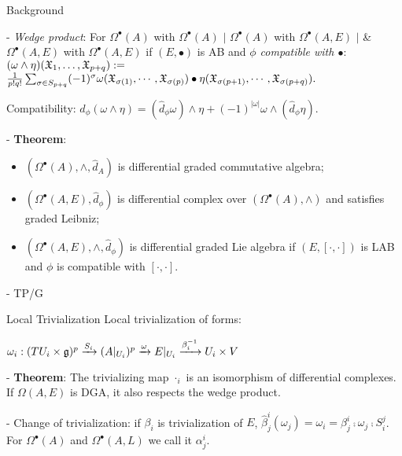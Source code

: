 \begin{frame}{Background}
    
    - \emph{Wedge product}: For $\Omega^\bullet(A)$ with $\Omega^\bullet(A)$ $|$ $\Omega^\bullet(A)$ with $\Omega^\bullet(A,E)$ $|$ \& $\Omega^\bullet(A,E)$ with $\Omega^\bullet(A,E)$ if $(E, \bullet)$ is AB and \emph{$\phi$ compatible with $\bullet$}: \quad $(\omega \wedge \eta)(\mathfrak{X}_1, \dots, \mathfrak{X}_{p+q}) :=$ 
    $\frac{1}{p!q!} \sum_{\sigma \in S_{p+q}} (-1)^{\sigma} \omega(\mathfrak{X}_{\sigma(1)}, \cdots, \mathfrak{X}_{\sigma(p)}) \bullet \eta(\mathfrak{X}_{\sigma(p+1)}, \cdots, \mathfrak{X}_{\sigma(p+q)}).$
    
    Compatibility: $\hat d_\phi(\omega \wedge \eta) = (\hat d_\phi\omega)\wedge \eta + (-1)^{|\omega|} \omega \wedge (\hat d_\phi\eta)$.
        
    - \textbf{Theorem}: 
    \begin{itemize}
        \item $(\Omega^\bullet(A), \wedge, \hat d_A)$ is differential graded commutative algebra;
        
        \item $(\Omega^\bullet(A, E), \hat d_\phi)$ is differential complex over $(\Omega^\bullet(A), \wedge)$ and satisfies graded Leibniz;
        
        \item $(\Omega^\bullet(A, E), \wedge, \hat d_{\phi})$ is differential graded Lie algebra if $(E, [\cdot, \cdot])$ is LAB and $\phi$ is compatible with $[\cdot, \cdot]$. 
        
    \end{itemize}
    
    - TP/G
    \end{frame}

\begin{frame}{Local Trivialization}
    Local trivialization of forms:
    
   $\omega_i : (TU_i \times \mathfrak{g})^p \xrightarrow{S_i} (A|_{U_i})^p \xrightarrow{\omega} E|_{U_i} \xrightarrow{\beta_i^{-1}} U_i \times V$
    
    - \textbf{Theorem}: The trivializing map $\cdot_i$ is an isomorphism of differential complexes. If $\Omega(A, E)$ is DGA, it also respects the wedge product.
    

- Change of trivialization: if $\beta_i$ is trivialization of $E$, $\hat \beta^i_j(\omega_j) = \omega_i = \beta^i_j \comp \omega_j \comp S_i^j$. For $\Omega^\bullet (A)$ and $\Omega^\bullet(A, L)$ we call it $\alpha^i_j$.

\end{frame}

